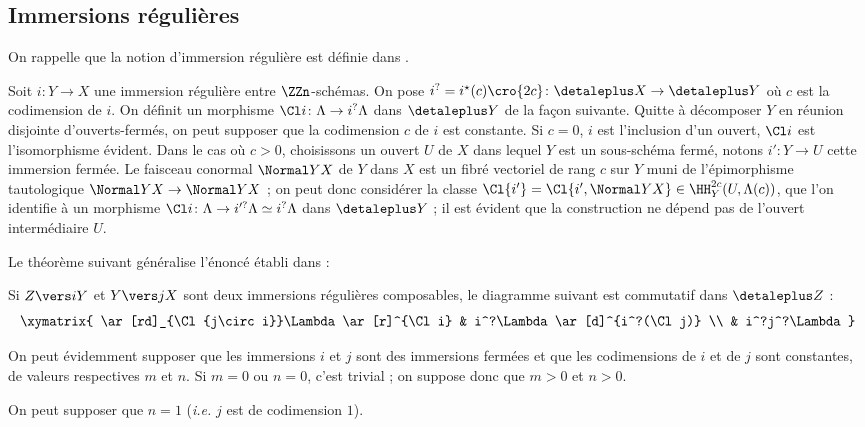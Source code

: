 \documentclass[10pt]{../fichiers-configuration-latex/smfart}
\begin{document}
\subsection{Immersions régulières}%

On rappelle que la notion d'immersion régulière est définie dans
.

\begin{definition2}\label{16-definition-cl-i}
Soit $i\colon Y\to X$ une immersion régulière entre $\ZZn$-schémas.
On pose $i^?=i^\star(c)\cro{2c}\colon \detaleplus X\to \detaleplus Y$ où $c$ est la
codimension de $i$.
On définit un morphisme 
$\Cl i \colon \Lambda\to i^?\Lambda$ dans $\detaleplus Y$ de la façon suivante.
Quitte à décomposer $Y$ en réunion disjointe d'ouverts-fermés, on peut
supposer que la codimension $c$ de $i$ est constante.
Si $c=0$, $i$ est l'inclusion d'un ouvert, $\Cl i$ est
l'isomorphisme évident. Dans le cas où $c>0$,
choisissons un ouvert $U$ de $X$ dans lequel $Y$ est un sous-schéma fermé,
notons $i'\colon Y\to U$ cette immersion fermée. Le faisceau conormal
$\Normal Y X$ de $Y$ dans $X$ est un fibré vectoriel de rang $c$ sur $Y$
muni de l'épimorphisme tautologique $\Normal Y X\to\Normal Y X$ ; on peut
donc considérer la classe $\Cl {i'}=\Cl {i',\Normal Y X}\in
\HH^{2c}_Y(U,\Lambda(c))$, que l'on identifie à un morphisme $\Cl i\colon
\Lambda\to
i'^?\Lambda\simeq i^?\Lambda$ dans $\detaleplus Y$ ; il est évident que la
construction ne dépend pas de l'ouvert intermédiaire $U$.
\end{definition2}

Le théorème suivant généralise l'énoncé établi dans
\cite[proposition~1.2.1]{AZUMINO@Fujiwara} :

\begin{theoreme2}\label{16-theoreme-composition-cl-immersions-regulieres}
Si $Z\vers i Y$ et $Y \vers j X$ sont deux 
immersions régulières composables, le
diagramme suivant est commutatif dans $\detaleplus Z$ :
\[
\xymatrix{
\ar[rd]_{\Cl {j\circ i}}\Lambda\ar[r]^{\Cl i}  &
   i^?\Lambda \ar[d]^{i^?(\Cl j)} \\
&   i^?j^?\Lambda}
\]
\end{theoreme2}

On peut évidemment supposer que les immersions $i$ et $j$ sont des
immersions fermées et que les codimensions de $i$ et de $j$ sont constantes,
de valeurs respectives $m$ et $n$. Si $m=0$ ou $n=0$, c'est trivial ; on
suppose donc que $m>0$ et $n>0$.

\begin{lemme2}
On peut supposer que $n=1$ (\emph{i.e.} $j$ est de codimension $1$).
\end{lemme2}
\end{document}
